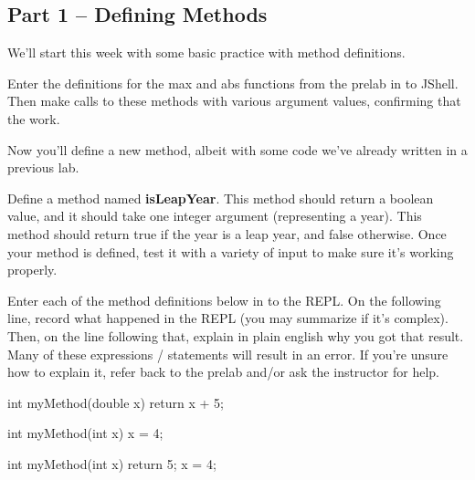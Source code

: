 \subsection{Part 1 -- Defining Methods}

We'll start this week with some basic practice with method definitions.

\begin{exer}
Enter the definitions for the max and abs functions from the prelab in to JShell. Then make calls to these methods with various argument values, confirming that the work.
\end{exer}

Now you'll define a new method, albeit with some code we've already written in a previous lab. 

\begin{exer}
Define a method named \textbf{isLeapYear}. This method should return a boolean value, and it should take one integer argument (representing a year). This method should return true if the year is a leap year, and false otherwise. Once your method is defined, test it with a variety of input to make sure it's working properly. 
\end{exer}



\begin{eval}

Enter each of the method definitions below in to the REPL. On the following line, record what happened in the REPL (you may summarize if it's complex). Then, on the line following that, explain in plain english why you got that result. Many of these expressions / statements will result in 
an error. If you're unsure how to explain it, refer back to the prelab and/or ask the instructor for help.

\begin{sevalenum}

\item
\begin{code}
int myMethod(double x) { 
  return x + 5;
}
\end{code}

\evallinetwo

\item 
\begin{code}
int myMethod(int x) { 
    x = 4;
}
\end{code}

\evallinetwo

\item 
\begin{code}
int myMethod(int x) { 
  return 5;
  x = 4;
}
\end{code}

\evallinetwo

\end{sevalenum}
\end{eval}



